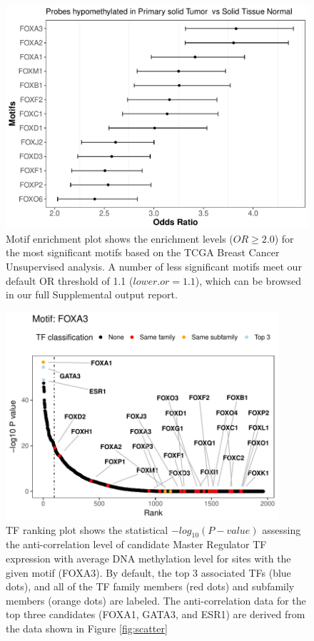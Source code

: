 \begin{figure}
\centering
\includegraphics[width=1.0\textwidth]{images/motif_new.pdf}
\caption[Motif enrichment plot]{\label{fig:motifplot} Motif enrichment plot shows the enrichment levels ($OR\geq2.0$) for the most significant motifs based on the TCGA Breast Cancer Unsupervised analysis. A number of less significant motifs meet our default OR threshold of 1.1 ($\textit{lower.or}=1.1$), which can be browsed in our full Supplemental output report.}
\end{figure}

\begin{figure}
\centering
\includegraphics[width=0.9\textwidth]{images/TFranking.pdf}
\caption[TF ranking plot for FOXA3 motif]{\label{fig:tfplot} TF ranking plot shows the statistical $-log_{10}(P-value)$ assessing the anti-correlation level of candidate Master Regulator TF expression with average DNA methylation level for sites with the given motif (FOXA3). By default, the top 3 associated TFs (blue dots), and all of the TF family members (red dots) and subfamily members (orange dots) are labeled. The anti-correlation data for the top three candidates (FOXA1, GATA3, and ESR1) are derived from the data shown in Figure \ref{fig:scatter}}
\end{figure}

